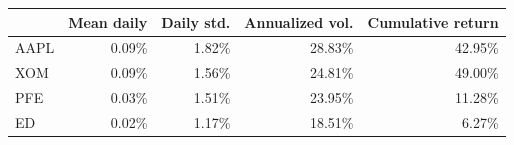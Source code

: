 \begin{tabular}{lrrrr}
\toprule
 & Mean daily & Daily std. & Annualized vol. & Cumulative return \\
\midrule
AAPL & 0.09\% & 1.82\% & 28.83\% & 42.95\% \\
XOM & 0.09\% & 1.56\% & 24.81\% & 49.00\% \\
PFE & 0.03\% & 1.51\% & 23.95\% & 11.28\% \\
ED & 0.02\% & 1.17\% & 18.51\% & 6.27\% \\
\bottomrule
\end{tabular}
